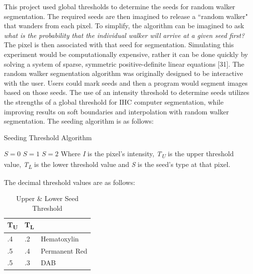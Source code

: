 \documentclass[12pt]{article}
\begin{document}
This project used global thresholds to determine the seeds for random walker segmentation. The required seeds are then imagined to release a ``random walker" that wanders from each pixel. To simplify, the algorithm can be imagined to ask \textit{what is the probability that the individual walker will arrive at a given seed first?} The pixel is then associated with that seed for segmentation. Simulating this experiment would be computationally expensive, rather it can be done quickly by solving a system of sparse, symmetric positive-definite linear equations [31]. The random walker segmentation algorithm was originally designed to be interactive with the user. Users could mark seeds and then a program would segment images based on those seeds. The use of an intensity threshold to determine seeds utilizes the strengths of a global threshold for IHC computer segmentation, while improving results on soft boundaries and interpolation with random walker segmentation. The seeding algorithm is as follows:


\begin{algorithm}
\caption{Seeding Threshold Algorithm}
\begin{algorithmic} 
\STATE $S = 0$
\STATE $S = 1$
\STATE $S = 2$
\ENDIF
\ENDFOR
\STATE
\STATE Where \textit{I} is the pixel's intensity,
\STATE \textit{T\textsubscript{U}} is the upper threshold value,
\STATE \textit{T\textsubscript{L}} is the lower threshold value
\STATE and \textit{S} is the seed's type at that pixel.
\end{algorithmic}
\end{algorithm}

\newpage 

\noindent The decimal threshold values are as follows:

\begin{table}[H]
\centering
\caption{Upper \& Lower Seed Threshold}
\label{UL Seed Thresh}
\begin{tabular}{|l|l|l}
\cline{1-2}
T\textsubscript{U} & T\textsubscript{L} &                                    \\ \hline
.4   & .2   & \multicolumn{1}{l|}{Hematoxylin}   \\ \hline
.5   & .4   & \multicolumn{1}{l|}{Permanent Red} \\ \hline
.5   & .3   & \multicolumn{1}{l|}{DAB}           \\ \hline
\end{tabular}
\end{table}
\end{document}
